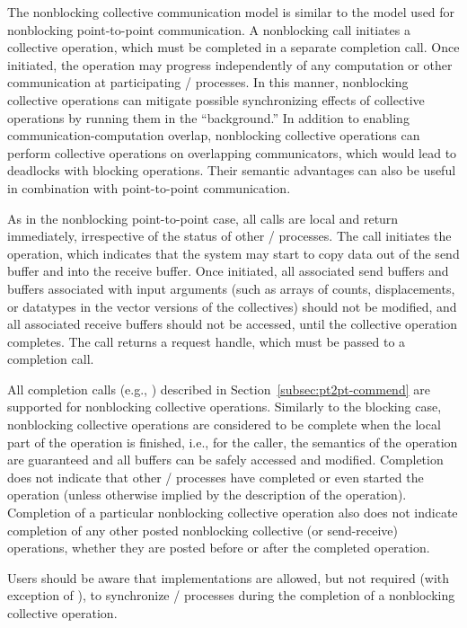 The nonblocking collective communication model is similar to the model
used for nonblocking point-to-point communication. A nonblocking
call initiates a collective operation, which must be
completed in a separate completion call.
Once initiated, the operation may
progress%
independently of any
computation or other communication at participating \MPI/ processes. In this
manner, nonblocking collective operations can mitigate possible
synchronizing effects of collective operations by running them in the
``background.''
In addition to enabling communication-computation
overlap, nonblocking collective operations can perform
collective operations on overlapping communicators, which would lead to
deadlocks with blocking operations. Their semantic advantages can also be
useful in combination with point-to-point communication.

As in the nonblocking point-to-point case, all calls are local and
return immediately, irrespective of the status of other \MPI/ processes. The
call initiates the operation, which indicates that the system may
start to copy data out of the send buffer and into the receive buffer.
Once initiated, all associated send buffers and buffers associated with
input arguments (such as arrays of counts, displacements, or datatypes
in the vector versions of the collectives) should not be modified, and
all associated receive buffers should not be accessed, until the
collective operation completes. The
call returns a request handle, which must be passed to a
completion call.

All completion calls (e.g., ) described in
Section~\ref{subsec:pt2pt-commend} are supported for nonblocking collective
operations. Similarly to the blocking case, nonblocking collective operations are
considered to be complete when the local part of the operation is
finished, i.e., for the caller, the semantics of the operation are
guaranteed and all buffers can be safely accessed and modified.
Completion does not indicate that other \MPI/ processes have completed or even
started the operation (unless otherwise implied by the description of
the operation). Completion of a particular nonblocking collective
operation also does not indicate completion of any other posted
nonblocking collective (or send-receive) operations, whether they are
posted before or after the completed operation.

\begin{users}
Users should be aware that implementations are allowed, but not required
(with exception of ), to synchronize \MPI/ processes
during the completion of a nonblocking collective operation.
\end{users}


